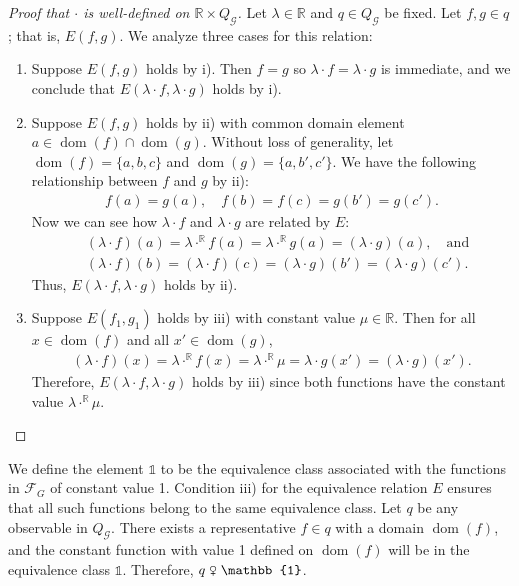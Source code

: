 \documentclass{scrartcl}
\DeclareMathOperator{\dom}{dom}
\newcommand{\SF}{\mathscr{F}}
\newcommand{\SG}{\mathscr{G}}
\newcommand{\BR}{\mathbb{R}}
\newcommand{\com}{\mathrel{\venus}}
\begin{document}
\begin{proof}[Proof that $\cdot$ is well-defined on $\BR\times Q_{\SG}$] Let $\lambda\in\BR$ and $q\in Q_{\SG}$ be fixed. Let $f,g\in q$; that is, $E(f,g)$. We analyze three cases for this relation:

\begin{enumerate}[(1)]
\item Suppose $E(f,g)$ holds by i). Then $f=g$ so $\lambda\cdot f=\lambda\cdot g$ is immediate, and we conclude that $E(\lambda\cdot f,\lambda\cdot g)$ holds by i).

\item Suppose $E(f,g)$ holds by ii) with common domain element $a\in\dom(f)\cap\dom(g)$. Without loss of generality, let $\dom(f)=\{a,b,c\}$ and $\dom(g)=\{a,b',c'\}$. We have the following relationship between $f$ and $g$ by ii):
\begin{align*}
f(a)=g(a),\quad f(b)=f(c)=g(b')=g(c').
\end{align*}
Now we can see how $\lambda\cdot f$ and $\lambda\cdot g$ are related by $E$:
\begin{align*}
&(\lambda\cdot f)(a)=\lambda\cdot^{\BR}f(a)=\lambda\cdot^{\BR}g(a)=(\lambda\cdot g)(a),\quad\text{and}\\
&(\lambda\cdot f)(b)=(\lambda\cdot f)(c)=(\lambda\cdot g)(b')=(\lambda\cdot g)(c').
\end{align*}
Thus, $E(\lambda\cdot f,\lambda\cdot g)$ holds by ii).

\item Suppose $E(f_1,g_1)$ holds by iii) with constant value $\mu\in\BR$. Then for all $x\in\dom(f)$ and all $x'\in\dom(g)$,
\begin{align*}
(\lambda\cdot f)(x)=\lambda\cdot^{\BR}f(x)=\lambda\cdot^{\BR}\mu=\lambda\cdot g(x')=(\lambda\cdot g)(x').
\end{align*}
Therefore, $E(\lambda\cdot f,\lambda\cdot g)$ holds by iii) since both functions have the constant value $\lambda\cdot^{\BR}\mu$.
\end{enumerate}
\end{proof}

We define the element $\mathbb{1}$ to be the equivalence class associated with the functions in $\SF_G$ of constant value 1. Condition iii) for the equivalence relation $E$ ensures that all such functions belong to the same equivalence class. Let $q$ be any observable in $Q_{\SG}$. There exists a representative $f\in q$ with a domain $\dom(f)$, and the constant function with value 1 defined on $\dom(f)$ will be in the equivalence class $\mathbb{1}$. Therefore, $q\com\mathbb{1}$.
\end{document}
